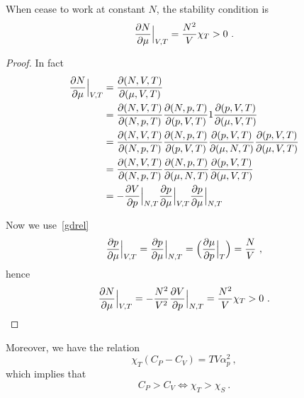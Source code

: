     When cease to work at constant $N$, the stability condition is 
    \begin{equation*}
        \frac{\partial N}{\partial\mu} \Big \vert_{V, T} = \frac{N^2}{V} \chi_T > 0 ~.
    \end{equation*}
    \begin{proof}
        In fact 
        \begin{equation*}
        \begin{aligned}
            \frac{\partial N}{\partial\mu} \Big \vert_{V, T} & = \frac{\partial(N, V, T)}{\partial(\mu, V, T)} \\ & = \frac{\partial(N, V, T)}{\partial(N, p, T)} \frac{\partial(N, p, T)}{\partial(p, V, T)} 1 \frac{\partial(p, V, T)}{\partial(\mu, V, T)} \\ & = \frac{\partial(N, V, T)}{\partial(N, p, T)} \frac{\partial(N, p, T)}{\partial(p, V, T)} \frac{\partial(p, V, T)}{\partial(\mu, N, T)} \frac{\partial(p, V, T)}{\partial(\mu, V, T)} \\ & = \frac{\partial(N, V, T)}{\partial(N, p, T)} \frac{\partial(N, p, T)}{\partial(\mu, N, T)} \frac{\partial(p, V, T)}{\partial(\mu, V, T)} \\ & = - \frac{\partial V}{\partial p} \Big \vert_{N, T}  \frac{\partial p}{\partial\mu} \Big \vert_{V, T}  \frac{\partial p}{\partial\mu} \Big \vert_{N, T} 
        \end{aligned}
        \end{equation*}

        Now we use~\eqref{gdrel}
        \begin{equation*}
            \frac{\partial p}{\partial\mu} \Big \vert_{V, T} = \frac{\partial p}{\partial\mu} \Big \vert_{N, T} = \Big ( \frac{\partial\mu}{\partial p} \Big \vert_T \Big) = \frac{N}{V} ~,
        \end{equation*}
        hence 
        \begin{equation*}
        \frac{\partial N}{\partial\mu} \Big \vert_{V, T} = - \frac{N^2}{V^2} \frac{\partial V}{\partial p} \Big \vert_{N,T} = \frac{N^2}{V} \chi_T > 0 ~.
        \end{equation*}
    \end{proof}

    Moreover, we have the relation 
    \begin{equation*}
        \chi_T (C_P - C_V) = T V \alpha_p^2 ~,
    \end{equation*}
    which implies that 
    \begin{equation*}
        C_P > C_V \iff \chi_T > \chi_S ~.
    \end{equation*}

